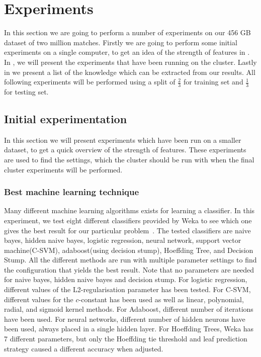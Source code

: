 \section{Experiments}\label{sec:testing}
In this section we are going to perform a number of experiments on our 456 GB dataset of two million matches. Firstly we are going to perform some initial experiments on a single computer, to get an idea of the strength of features in . In , we will present the experiments that have been running on the cluster. Lastly in  we present a list of the knowledge which can be extracted from our results. All following experiments will be performed using a split of $\frac{2}{3}$ for training set and $\frac{1}{3}$ for testing set. 

\subsection{Initial experimentation}\label{sec:initialtest}
In this section we will present experiments which have been run on a smaller dataset, to get a quick overview of the strength of features. These experiments are used to find the settings, which the cluster should be run with when the final cluster experiments will be performed. 

\subsubsection{Best machine learning technique}
Many different machine learning algorithms exists for learning a classifier. In this experiment, we test eight different classifiers provided by Weka to see which one gives the best result for our particular problem~\cite{weka}. The tested classifiers are naive bayes, hidden naive bayes, logistic regression, neural network, support vector machine(C-SVM), adaboost(using decision stump), Hoeffding Tree, and Decision Stump. All the different methods are run with multiple parameter settings to find the configuration that yields the best result. Note that no parameters are needed for naive bayes, hidden naive bayes and decision stump. For logistic regression, different values of the L2-regularisation parameter has been tested. For C-SVM, different values for the $c$-constant has been used as well as linear, polynomial, radial, and sigmoid kernel methods. For Adaboost, different number of iterations have been used. For neural networks, different number of hidden neurons have been used, always placed in a single hidden layer. For Hoeffding Trees, Weka has 7 different parameters, but only the Hoeffding tie threshold and leaf prediction strategy caused a different accuracy when adjusted.

